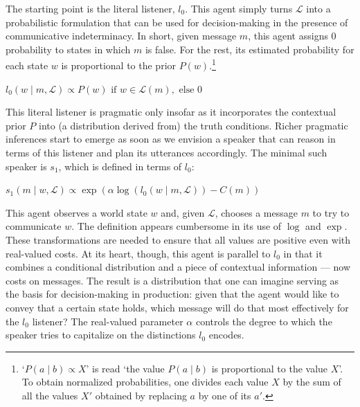 \documentclass[12pt,twoside]{article}
\DeclareMathOperator{\exponential}{exp}
\newcommand{\given}{\mid}
\newcommand{\state}{w}
\newcommand{\Lex}{\mathcal{L}}
\newcommand{\msg}{m}
\newcommand{\Costs}{C}
\newcommand{\Prior}{P}
\newcommand{\listenerZero}{l_{0}}
\newcommand{\speakerOne}{s_{1}}
\renewcommand{\_}{\textbf{\textunderscore\hspace{-4pt}\textunderscore\hspace{-3pt}\textunderscore\hspace{-4pt}\textunderscore}\hspace{0.5pt}}			%
\begin{document}
The starting point is the literal listener, $\listenerZero$. This
agent simply turns $\Lex$ into a probabilistic formulation that can be
used for decision-making in the presence of communicative
indeterminacy. In short, given message $\msg$, this agent assigns $0$
probability to states in which $\msg$ is false. For the rest, its
estimated probability for each state $\state$ is proportional to the
prior $\Prior(\state)$.\footnote{`$P(a \given b) \propto X$' is read
  `the value $P(a \given b)$ is proportional to the value $X$'. To
  obtain normalized probabilities, one divides each value $X$ by the
  sum of all the values $X'$ obtained by replacing $a$ by one of its
  $a'$.}
%
\begin{exe}
\ex\label{l0} $\listenerZero(\state \given \msg, \Lex) \propto \Prior(\state) \text{ if } \state \in \Lex(\msg), \text{ else } 0$
\end{exe}

This literal listener is pragmatic only insofar as it incorporates the
contextual prior $\Prior$ into (a distribution derived from) the truth
conditions. Richer pragmatic inferences start to emerge as soon as we
envision a speaker that can reason in terms of this listener and plan
its utterances accordingly. The minimal such speaker is $\speakerOne$,
which is defined in terms of $\listenerZero$:
%
%
%
%
\begin{exe}
\ex\label{s1} $\speakerOne(\msg \given \state, \Lex) \propto \exponential \left( \alpha\log \left( \listenerZero(\state \given \msg, \Lex) \right) -  \Costs(\msg) \right)$
\end{exe}
%
This agent observes a world state $\state$ and, given $\Lex$, chooses
a message $\msg$ to try to communicate $\state$. The definition
appears cumbersome in its use of $\log$ and $\exponential$. These
transformations are needed to ensure that all values are positive even
with real-valued costs. At its heart, though, this agent is parallel
to $\listenerZero$ in that it combines a conditional distribution and
a piece of contextual information --- now costs on messages. The
result is a distribution that one can imagine serving as the basis for
decision-making in production: given that the agent would like to
convey that a certain state holds, which message will do that most
effectively for the $\listenerZero$ listener? The real-valued
parameter $\alpha$ controls the degree to which the speaker tries to
capitalize on the distinctions $\listenerZero$ encodes.
\end{document}
